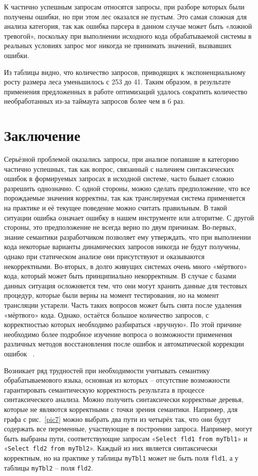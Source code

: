 \documentclass[a5paper]{article}
\begin{document}
К частично успешным запросам относятся запросы, при разборе которых были получены ошибки, но при этом лес оказался не пустым. Это самая сложная для анализа категория, так как ошибка парсера в данном случае может быть «ложной тревогой», поскольку при выполнении исходного кода обрабатываемой системы в реальных условиях запрос мог никогда не принимать значений, вызвавших ошибки.

Из таблицы видно, что количество запросов, приводящих к экспоненциальному росту размера леса уменьшилось с 253 до 41. Таким образом, в результате применения предложенных в работе оптимизаций удалось сократить количество необработанных из-за таймаута запросов более чем в 6 раз. 


\section*{Заключение}

Серьёзной проблемой оказались запросы, при анализе попавшие в категорию частично успешных, так как вопрос, связанный с наличием синтаксических ошибок в формируемых запросах в исходной системе, часто бывает сложно разрешить однозначно. С одной стороны, можно сделать предположение, что все порождаемые значения корректны, так как транслируемая система применяется на практике и её текущее поведение можно считать правильным. В такой ситуации ошибка означает ошибку в нашем инструменте или алгоритме. С другой стороны, это предположение не всегда верно по двум причинам. Во-первых, знание семантики разработчиком позволяет ему утверждать, что при выполнении кода некоторые варианты динамических запросов никогда не будут получены, однако при статическом анализе они присутствуют и оказываются некорректными. Во-вторых, в долго живущих системах очень много «мёртвого» кода, который может быть принципиально некорректным. В случае с базами данных ситуация осложняется тем, что они могут хранить данные для тестовых процедур, которые были верны на момент тестирования, но на момент трансляции устарели. Часть таких вопросов может быть снята после удаления «мёртвого» кода. Однако, остаётся большое количество запросов, с корректностью которых необходимо разбираться «вручную». По этой причине необходимо более подробное изучение вопроса о возможности применения различных методов восстановления после ошибок и автоматической коррекции ошибок ~\cite{RelaxedLALR}.

Возникает ряд трудностей при необходимости учитывать семантику обрабатываемового языка, основная из которых -- отсутствие возможности гарантировать семантическую корректность результата в процессе синтаксического анализа. Можно получить синтаксически корректные деревья, которые не являются корректными с точки зрения семантики. Например, для графа с рис.~\ref{pic7} можно выбрать два пути из четырёх так, что они будут содержать все переменные, участвующие в построении запроса. Например, могут быть выбраны пути, соответствующие запросам «\verb|Select fld1 from myTbl1|» и «\verb|Select fld2 from myTbl2|». Каждый из них является синтаксически корректным, но на практике у таблицы \verb|myTbl1|  может не быть поля \verb|fld1|, а у таблицы  \verb|myTbl2| -- поля \verb|fld2|.
\end{document}
